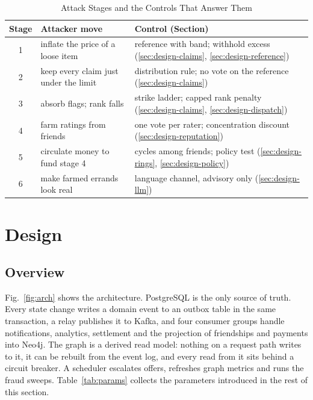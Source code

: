 \documentclass[journal]{IEEEtran}
\begin{document}
\begin{table}[!t]
\caption{Attack Stages and the Controls That Answer Them}
\label{tab:threat}
\centering
\footnotesize
\begin{tabular}{@{}c>{\raggedright}p{}>{\raggedright\arraybackslash}p{}@{}}
\toprule
Stage & Attacker move & Control (Section) \\
\midrule
1 & inflate the price of a loose item & reference with band; withhold excess
(\ref{sec:design-claims}, \ref{sec:design-reference}) \\
2 & keep every claim just under the limit & distribution rule; no vote on the
reference (\ref{sec:design-claims}) \\
3 & absorb flags; rank falls & strike ladder; capped rank penalty
(\ref{sec:design-claims}, \ref{sec:design-dispatch}) \\
4 & farm ratings from friends & one vote per rater; concentration discount
(\ref{sec:design-reputation}) \\
5 & circulate money to fund stage 4 & cycles among friends; policy test
(\ref{sec:design-rings}, \ref{sec:design-policy}) \\
6 & make farmed errands look real & language channel, advisory only
(\ref{sec:design-llm}) \\
\bottomrule
\end{tabular}
\end{table}

\section{Design}\label{sec:design}

\subsection{Overview}
Fig.~\ref{fig:arch} shows the architecture. PostgreSQL is the only source of truth.
Every state change writes a domain event to an outbox table in the same transaction,
a relay publishes it to Kafka, and four consumer groups handle notifications,
analytics, settlement and the projection of friendships and payments into Neo4j. The
graph is a derived read model: nothing on a request path writes to it, it can be
rebuilt from the event log, and every read from it sits behind a circuit breaker. A
scheduler escalates offers, refreshes graph metrics and runs the fraud sweeps.
Table~\ref{tab:params} collects the parameters introduced in the rest of this section.
\end{document}
